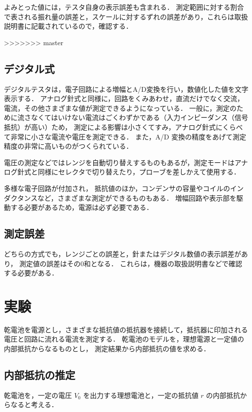 \documentclass[11pt,sort]{jarticle}
\begin{document}
よみとった値には，テスタ自身の表示誤差も含まれる．
測定範囲に対する割合で表される振れ量の誤差と，スケールに対するずれの誤差があり，これらは取扱説明書に記載されているので，確認する．

>>>>>>> master

\subsection{デジタル式}
デジタルテスタは，電子回路による増幅とA/D変換を行い，数値化した値を文字表示する．
アナログ針式と同様に，回路をくみあわせ，直流だけでなく交流，電流，その他さまざまな値が測定できるようになっている．
一般に，測定のために流さなくてはいけない電流はごくわずかである（入力インピーダンス（信号抵抗）が高い）ため，
測定による影響は小さくてすみ，アナログ針式にくらべて非常に小さな電流や電圧を測定できる．
また，A/D 変換の精度をあげて測定精度の非常に高いものがつくられている．

電圧の測定などではレンジを自動切り替えするものもあるが，測定モードはアナログ針式と同様にセレクタで切り替えたり，プローブを差しかえて使用する．

多様な電子回路が付加され，
抵抗値のほか，コンデンサの容量やコイルのインダクタンスなど，さまざまな測定ができるものもある．
増幅回路や表示部を駆動する必要があるため，電源は必ず必要である．

\subsection{測定誤差}

どちらの方式でも，レンジごとの誤差と，針またはデジタル数値の表示誤差があり，
測定値の誤差はその0和となる．
これらは，機器の取扱説明書などで確認する必要がある．

\newpage
\section{実験}

乾電池を電源とし，さまざまな抵抗値の抵抗器を接続して，抵抗器に印加される電圧と回路に流れる電流を測定する．
乾電池のモデルを，理想電源と一定値の内部抵抗からなるものとし，
測定結果から内部抵抗の値を求める．

\subsection{内部抵抗の推定}\label{a}

乾電池を，一定の電圧 $V_0$ を出力する理想電池と，一定の抵抗値 $r$ の内部抵抗からなると考える．
\end{document}

